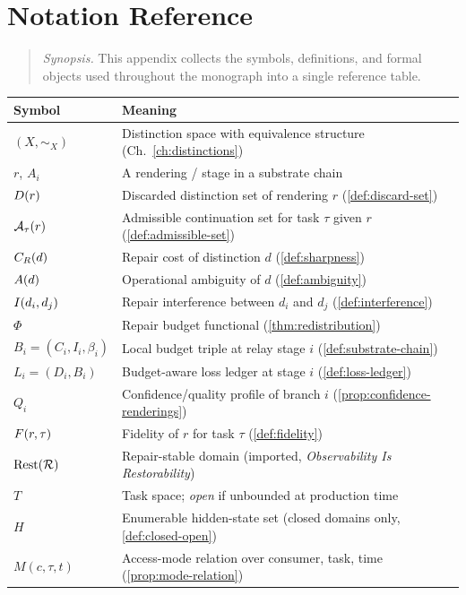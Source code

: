 \chapter{Notation Reference}
\label{app:notation}

\begin{quotation}
\noindent\textit{Synopsis.} This appendix collects the symbols,
definitions, and formal objects used throughout the monograph into a
single reference table.
\end{quotation}


{\small
\begin{longtable}{p{2.6cm}p{7.2cm}}
\toprule
Symbol & Meaning \\
\midrule
\endhead
$(X,\sim_X)$ & Distinction space with equivalence structure (Ch.~\ref{ch:distinctions}) \\
$r$, $A_i$ & A rendering / stage in a substrate chain \\
$D(r)$ & Discarded distinction set of rendering $r$ (\cref{def:discard-set}) \\
$\mathcal{A}_{\tau}(r)$ & Admissible continuation set for task $\tau$ given $r$ (\cref{def:admissible-set}) \\
$C_R(d)$ & Repair cost of distinction $d$ (\cref{def:sharpness}) \\
$A(d)$ & Operational ambiguity of $d$ (\cref{def:ambiguity}) \\
$I(d_i,d_j)$ & Repair interference between $d_i$ and $d_j$ (\cref{def:interference}) \\
$\Phi$ & Repair budget functional (\cref{thm:redistribution}) \\
$B_i = (C_i, I_i, \beta_i)$ & Local budget triple at relay stage $i$ (\cref{def:substrate-chain}) \\
$L_i = (D_i, B_i)$ & Budget-aware loss ledger at stage $i$ (\cref{def:loss-ledger}) \\
$Q_i$ & Confidence/quality profile of branch $i$ (\cref{prop:confidence-renderings}) \\
$F(r,\tau)$ & Fidelity of $r$ for task $\tau$ (\cref{def:fidelity}) \\
$\mathrm{Rest}(\mathcal{R})$ & Repair-stable domain (imported, \emph{Observability Is Restorability}) \\
$T$ & Task space; \emph{open} if unbounded at production time \\
$H$ & Enumerable hidden-state set (closed domains only, \cref{def:closed-open}) \\
$M(c,\tau,t)$ & Access-mode relation over consumer, task, time (\cref{prop:mode-relation}) \\

\end{longtable}}
